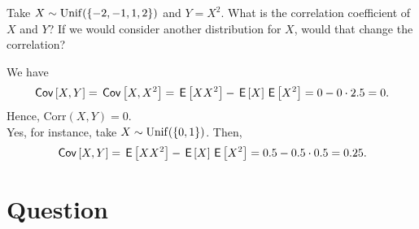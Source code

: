 \begin{exercise}
Take $X\sim\mathrm{Unif}(\{-2, -1, 1, 2\})$ and $Y= X^2$. What is the correlation coefficient of $X$ and $Y$?
If we would consider another distribution for $X$, would that change the correlation?
\begin{solution}
We have
\begin{align}
    \,\mathsf{Cov}\left[X,Y\right] = \,\mathsf{Cov}\left[X,X^2\right] = \,\mathsf{E}\left[XX^2\right] - \,\mathsf{E}\left[X\right]\,\mathsf{E}\left[X^2\right] = 0 - 0\cdot 2.5 = 0.
\end{align}
Hence, $\text{Corr}(X,Y) = 0$. \\
Yes, for instance, take $X \sim \mathrm{Unif}(\{0,1\})$. Then,
\begin{align}
    \,\mathsf{Cov}\left[X,Y\right] = \,\mathsf{E}\left[XX^2\right] - \,\mathsf{E}\left[X\right]\,\mathsf{E}\left[X^2\right] = 0.5 - 0.5\cdot 0.5 = 0.25.
\end{align}
\end{solution}
\end{exercise}


\section*{Question}

